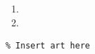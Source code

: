 \documentclass{article}
\begin{document}
\begin{enumerate}[itemsep=\fill]
\item %


\item %

\end{enumerate}


\centering
\small
\begin{BVerbatim}
% Insert art here
\end{BVerbatim}
\end{document}
